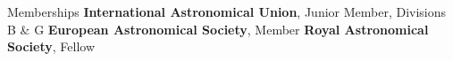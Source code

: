 \begin{rubric}{Memberships}
\entry*[2023 -- ~~~~~\,\,\,~~~]
    \textbf{International Astronomical Union}, Junior Member, Divisions B \& G
\entry*[2020 -- ~~~~~\,\,\,~~~]
    \textbf{European Astronomical Society}, Member
\entry*[2016 -- ~~~~~\,\,\,~~~]
    \textbf{Royal Astronomical Society}, Fellow

\end{rubric}
